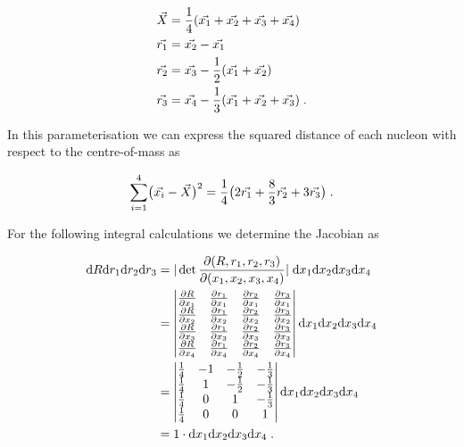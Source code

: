 \documentclass[a4paper,11pt]{scrartcl} %
\begin{document}
\begin{appendix}
\begin{align}
	\vec{X}    &= {1 \over 4} (\vec{x_1} + \vec{x_2} + \vec{x_3} + \vec{x_4}) \\
	\vec{r_1} &= \vec{x_2} - \vec{x_1}\\
	\vec{r_2} &= \vec{x_3} - {1 \over 2}(\vec{x_1} + \vec{x_2})\\
	\vec{r_3} &= \vec{x_4} - {1 \over 3}(\vec{x_1} + \vec{x_2} + \vec{x_3}) \; .
\end{align}

\noindent In this parameterisation we can express the squared distance of each nucleon with respect to the centre-of-mass as

\begin{equation}
 \sum_{i=1}^{4} \bigl(\vec{x_i} - \vec{X} \bigr)^2 = {1\over 4} \bigl(2\vec{r_1} + {8\over 3}\vec{r_2} + 3\vec{r_3}\bigr)  \; .
\end{equation}

\noindent For the following integral calculations we determine the Jacobian as

\begin{align}
	{\rm d}R{\rm d}r_{1}{\rm d}r_{2}{\rm d}r_{3} &= \vert\det {\partial(R,r_{1},r_{2},r_{3}) \over \partial(x_{1},x_{2},x_{3},x_{4})}\vert \; {\rm d}x_{1}{\rm d}x_{2}{\rm d}x_{3}{\rm d}x_{4} \\
		&= \begin{vmatrix} {\partial R \over \partial x_{1}} & {\partial r_{1} \over \partial x_{1}} & {\partial r_{2} \over \partial x_{1}}& {\partial r_{3} \over \partial x_{1}} \\ 
		{\partial R \over \partial x_{2}} & {\partial r_{1} \over \partial x_{2}} & {\partial r_{2} \over \partial x_{2}}& {\partial r_{3} \over \partial x_{2}} \\ 
		{\partial R \over \partial x_{3}} & {\partial r_{1} \over \partial x_{3}} & {\partial r_{2} \over \partial x_{3}}& {\partial r_{3} \over \partial x_{3}} \\ 
		{\partial R \over \partial x_{4}} & {\partial r_{1} \over \partial x_{4}} & {\partial r_{2} \over \partial x_{4}}& {\partial r_{3} \over \partial x_{4}} \end{vmatrix} 
		{\rm d}x_{1}{\rm d}x_{2}{\rm d}x_{3}{\rm d}x_{4} \\
		&=  \begin{vmatrix} {1\over 4} & -1 & -{1\over 2} & -{1\over 3}  \\
			{1\over 4} & 1 & -{1\over 2} & -{1\over 3}  \\
			{1\over 4} & 0 & 1 & -{1\over 3}  \\
			{1\over 4} & 0 & 0 & 1
			 \end{vmatrix} {\rm d}x_{1}{\rm d}x_{2}{\rm d}x_{3}{\rm d}x_{4} \\
		&= 1 \cdot {\rm d}x_{1}{\rm d}x_{2}{\rm d}x_{3}{\rm d}x_{4} \; .
\end{align}


\end{appendix}
\end{document}
